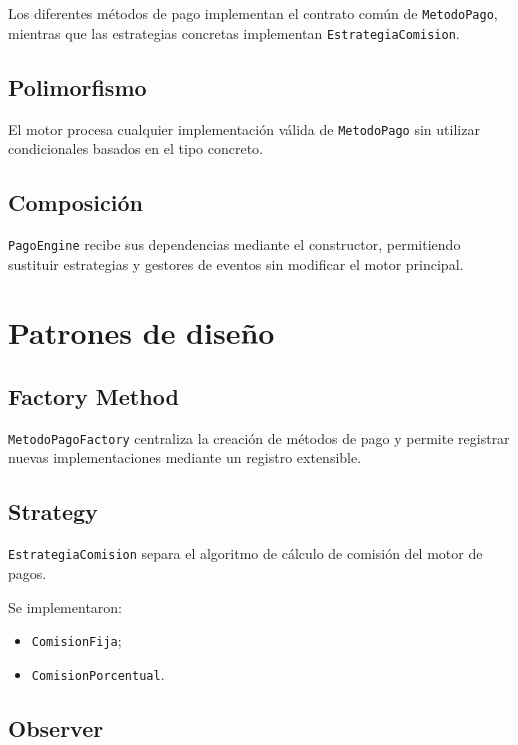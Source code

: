 \documentclass[11pt,a4paper]{article}
\begin{document}
Los diferentes métodos de pago implementan el contrato común
de \texttt{MetodoPago}, mientras que las estrategias concretas
implementan \texttt{EstrategiaComision}.

\subsection{Polimorfismo}

El motor procesa cualquier implementación válida de
\texttt{MetodoPago} sin utilizar condicionales basados en el
tipo concreto.

\subsection{Composición}

\texttt{PagoEngine} recibe sus dependencias mediante el
constructor, permitiendo sustituir estrategias y gestores de
eventos sin modificar el motor principal.

\section{Patrones de diseño}

\subsection{Factory Method}

\texttt{MetodoPagoFactory} centraliza la creación de métodos
de pago y permite registrar nuevas implementaciones mediante
un registro extensible.

\subsection{Strategy}

\texttt{EstrategiaComision} separa el algoritmo de cálculo de
comisión del motor de pagos.

Se implementaron:

\begin{itemize}
    \item \texttt{ComisionFija};
    \item \texttt{ComisionPorcentual}.
\end{itemize}

\subsection{Observer}
\end{document}
